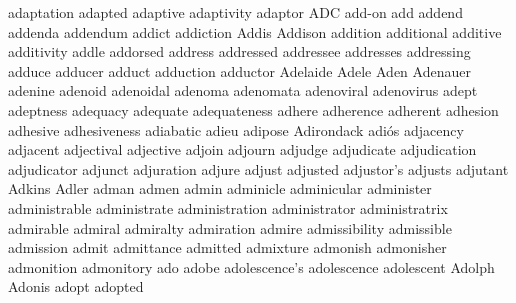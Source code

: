 adaptation adapted adaptive adaptivity adaptor ADC add-on add addend addenda addendum addict addiction Addis Addison addition additional additive additivity addle addorsed address addressed addressee addresses addressing adduce adducer adduct adduction adductor Adelaide Adele Aden Adenauer adenine adenoid adenoidal adenoma adenomata adenoviral adenovirus adept adeptness adequacy adequate adequateness adhere adherence adherent adhesion adhesive adhesiveness adiabatic adieu adipose Adirondack adiós adjacency adjacent adjectival adjective adjoin adjourn adjudge adjudicate adjudication adjudicator adjunct adjuration adjure adjust adjusted adjustor's adjusts adjutant Adkins Adler adman admen admin adminicle adminicular administer administrable administrate administration administrator administratrix admirable admiral admiralty admiration admire admissibility admissible admission admit admittance admitted admixture admonish admonisher admonition admonitory ado adobe adolescence's adolescence adolescent Adolph Adonis adopt adopted 
